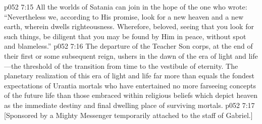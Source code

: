 \vs p052 7:15 All the worlds of Satania can join in the hope of the one who wrote: “Nevertheless we, according to His promise, look for a new heaven and a new earth, wherein dwells righteousness. Wherefore, beloved, seeing that you look for such things, be diligent that you may be found by Him in peace, without spot and blameless.”
\pc \vs p052 7:16 The departure of the Teacher Son corps, at the end of their first or some subsequent reign, ushers in the dawn of the era of light and life---the threshold of the transition from time to the vestibule of eternity. The planetary realization of this era of light and life far more than equals the fondest expectations of Urantia mortals who have entertained no more farseeing concepts of the future life than those embraced within religious beliefs which depict heaven as the immediate destiny and final dwelling place of surviving mortals.
\vsetoff
\vs p052 7:17 [Sponsored by a Mighty Messenger temporarily attached to the staff of Gabriel.]
